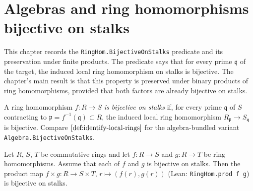 \chapter{Algebras and ring homomorphisms bijective on stalks}
\label{ch:Proetale_Algebra_StalkIso}

This chapter records the \texttt{RingHom.BijectiveOnStalks} predicate
and its preservation under finite products. The predicate says that
for every prime $\mathfrak q$ of the target, the induced local ring
homomorphism on stalks is bijective. The chapter's main result is
that this property is preserved under binary products of ring
homomorphisms, provided that both factors are already bijective on
stalks.

\begin{definition}
  \label{def:bijectiveOnStalks-prod-context}
  A ring homomorphism $f : R \to S$ \emph{is bijective on stalks} if,
  for every prime $\mathfrak q$ of $S$ contracting to
  $\mathfrak p = f^{-1}(\mathfrak q) \subset R$, the induced local
  ring homomorphism $R_{\mathfrak p} \to S_{\mathfrak q}$ is
  bijective. Compare $\Cref{def:identify-local-rings}$ for the
  algebra-bundled variant \texttt{Algebra.BijectiveOnStalks}.
\end{definition}

\begin{lemma}
  \label{lem:bijectiveOnStalks-prod-correct-signature}
  Let $R$, $S$, $T$ be commutative rings and let $f : R \to S$ and
  $g : R \to T$ be ring homomorphisms. Assume that each of $f$ and
  $g$ is bijective on stalks. Then the product map
  $f \times g : R \to S \times T$, $r \mapsto (f(r), g(r))$
  (Lean: \texttt{RingHom.prod f g}) is bijective on stalks.
\end{lemma}

